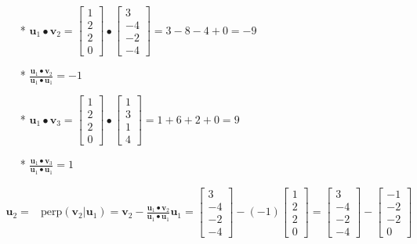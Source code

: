 \documentclass{article}
\begin{document}
\begin{description}
\begin{itemize}
\item[*] \(\mathbf{u}_1 \bullet \mathbf{v}_2 = \begin{bmatrix} 1 \\ 2 \\ 2 \\ 0 \end{bmatrix} \bullet \begin{bmatrix} 3 \\ -4 \\ -2 \\ -4 \end{bmatrix} = 3 - 8 - 4 + 0 = -9\)
\item[*] \(\frac{\mathbf{u}_1 \bullet \mathbf{v}_2}{\mathbf{u}_1 \bullet \mathbf{u}_1} = -1\)
\item[*] \(\mathbf{u}_1 \bullet \mathbf{v}_3 = \begin{bmatrix} 1 \\ 2 \\ 2 \\ 0 \end{bmatrix} \bullet \begin{bmatrix} 1 \\ 3 \\ 1 \\ 4 \end{bmatrix} = 1 + 6 + 2 + 0 = 9\)
\item[*] \(\frac{\mathbf{u}_1 \bullet \mathbf{v}_3}{\mathbf{u}_1 \bullet \mathbf{u}_1} = 1\)
\end{itemize}
\begin{align*}
\mathbf{u}_2 = & \text{perp}(\mathbf{v}_2 | \mathbf{u}_1) = \mathbf{v}_2 - \frac{\mathbf{u}_1 \bullet \mathbf{v}_2}{\mathbf{u}_1 \bullet \mathbf{u}_1}\mathbf{u}_1 
= \begin{bmatrix} 3 \\ -4 \\ -2 \\ -4 \end{bmatrix} - (-1)\begin{bmatrix} 1 \\ 2 \\ 2 \\ 0 \end{bmatrix} 
= \begin{bmatrix} 3 \\ -4 \\ -2 \\ -4 \end{bmatrix} - \begin{bmatrix} -1 \\ -2 \\ -2 \\ 0 \end{bmatrix} \\

\end{align*}
\end{description}
\end{document}
